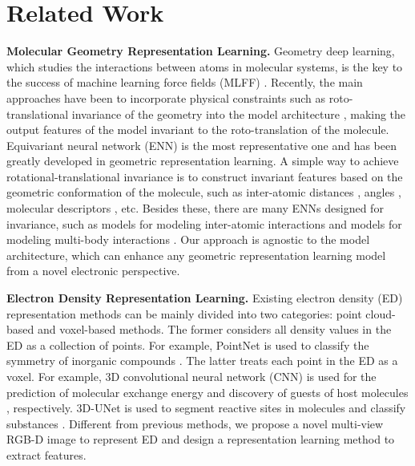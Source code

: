 \documentclass{article}
\begin{document}
\section{Related Work}
\label{RelatedWork}

\textbf{Molecular Geometry Representation Learning.} Geometry deep learning, which studies the interactions between atoms in molecular systems, is the key to the success of machine learning force fields (MLFF) \cite{liu2022spherical,wang2024enhancing}. Recently, the main approaches have been to incorporate physical constraints such as roto-translational invariance of the geometry into the model architecture \cite{zaidipre,wang2024efficiently}, making the output features of the model invariant to the roto-translation of the molecule. Equivariant neural network (ENN) \cite{satorras2021n} is the most representative one and has been greatly developed in geometric representation learning. A simple way to achieve rotational-translational invariance is to construct invariant features based on the geometric conformation of the molecule, such as inter-atomic distances \cite{fuchs2020se}, angles \cite{liu2022spherical}, molecular descriptors \cite{todeschini2009molecular}, etc. Besides these, there are many ENNs designed for invariance, such as models for modeling inter-atomic interactions \cite{schutt2017schnet,satorras2021n,liao2023equiformer} and models for modeling multi-body interactions \cite{wang2024efficiently,wang2024enhancing}. Our approach is agnostic to the model architecture, which can enhance any geometric representation learning model from a novel electronic perspective.%


\textbf{Electron Density Representation Learning.} Existing electron density (ED) representation methods can be mainly divided into two categories: point cloud-based and voxel-based methods. The former considers all density values in the ED as a collection of points. For example, PointNet \cite{qi2017pointnet} is used to classify the symmetry of inorganic compounds \cite{kim2024deep}. The latter treats each point in the ED as a voxel. For example, 3D convolutional neural network (CNN) \cite{liu2015sparse} is used for the prediction of molecular exchange energy \cite{gong2023incorporation} and discovery of guests of host molecules \cite{parrilla2024electron}, respectively. 3D-UNet \cite{cciccek20163d} is used to segment reactive sites in molecules and classify substances \cite{singh2024classification}. Different from previous methods, we propose a novel multi-view RGB-D image to represent ED and design a representation learning method to extract features.
\end{document}
